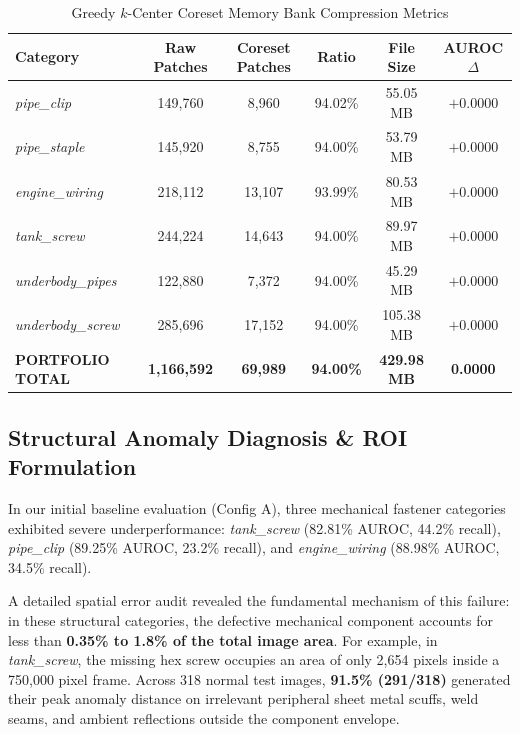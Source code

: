 \documentclass[journal,twocolumn]{IEEEtran}
\begin{document}
\begin{table}[t]
\caption{Greedy $k$-Center Coreset Memory Bank Compression Metrics}
\label{tab:coreset}
\centering
\scriptsize
\begin{tabular}{lccccc}
\toprule
\textbf{Category} & \textbf{Raw Patches} & \textbf{Coreset Patches} & \textbf{Ratio} & \textbf{File Size} & \textbf{AUROC $\Delta$} \\
\midrule
\textit{pipe\_clip} & 149,760 & 8,960 & 94.02\% & 55.05 MB & $+0.0000$ \\
\textit{pipe\_staple} & 145,920 & 8,755 & 94.00\% & 53.79 MB & $+0.0000$ \\
\textit{engine\_wiring} & 218,112 & 13,107 & 93.99\% & 80.53 MB & $+0.0000$ \\
\textit{tank\_screw} & 244,224 & 14,643 & 94.00\% & 89.97 MB & $+0.0000$ \\
\textit{underbody\_pipes} & 122,880 & 7,372 & 94.00\% & 45.29 MB & $+0.0000$ \\
\textit{underbody\_screw} & 285,696 & 17,152 & 94.00\% & 105.38 MB & $+0.0000$ \\
\midrule
\textbf{PORTFOLIO TOTAL} & \textbf{1,166,592} & \textbf{69,989} & \textbf{94.00\%} & \textbf{429.98 MB} & \textbf{0.0000} \\
\bottomrule
\end{tabular}
\end{table}

\subsection{Structural Anomaly Diagnosis \& ROI Formulation}
In our initial baseline evaluation (Config A), three mechanical fastener categories exhibited severe underperformance: \textit{tank\_screw} (82.81\% AUROC, 44.2\% recall), \textit{pipe\_clip} (89.25\% AUROC, 23.2\% recall), and \textit{engine\_wiring} (88.98\% AUROC, 34.5\% recall).

A detailed spatial error audit revealed the fundamental mechanism of this failure: in these structural categories, the defective mechanical component accounts for less than \textbf{0.35\% to 1.8\% of the total image area}. For example, in \textit{tank\_screw}, the missing hex screw occupies an area of only 2,654 pixels inside a 750,000 pixel frame. Across 318 normal test images, \textbf{91.5\% (291/318)} generated their peak anomaly distance on irrelevant peripheral sheet metal scuffs, weld seams, and ambient reflections outside the component envelope.
\end{document}
